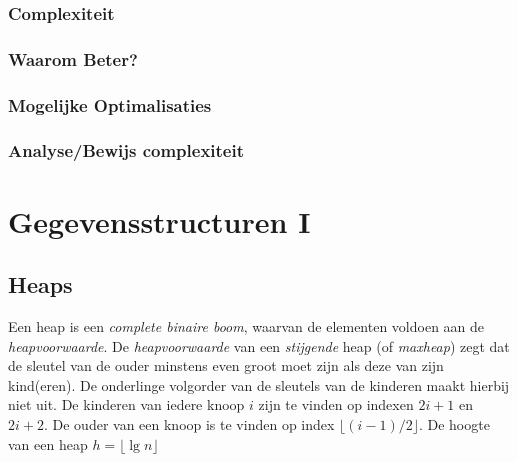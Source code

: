 \documentclass{article}
\begin{document}

\subsubsection{Complexiteit} %
\label{sub:complexiteit}


\subsubsection{Waarom Beter?} %
\label{sub:waarom_beter}


\subsubsection{Mogelijke Optimalisaties} %
\label{sub:mogelijke_optimalisaties}


\subsubsection{Analyse/Bewijs complexiteit} %
\label{sub:analyse_bewijs_complexiteit}


\newpage

\section{Gegevensstructuren I\label{gegI}}
\subsection{Heaps} %
\label{sub:heaps}
Een heap is een \textit{complete binaire boom}, waarvan de elementen voldoen aan de \textit{heapvoorwaarde}. De \textit{heapvoorwaarde} van een \textit{stijgende} heap (of \textit{maxheap}) zegt dat de sleutel van de ouder minstens even groot moet zijn als deze van zijn kind(eren). De onderlinge volgorder van de sleutels van de kinderen maakt hierbij niet uit. De kinderen van iedere knoop $i$ zijn te vinden op indexen $2i+1$ en $2i+2$. De ouder van een knoop is te vinden op index $\lfloor(i-1)/2\rfloor$. De hoogte van een heap $h = \lfloor \lg n \rfloor$
\end{document}
